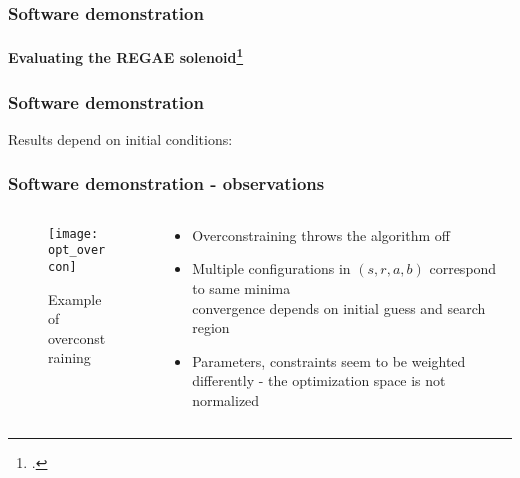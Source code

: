 
\begin{frame}
  \frametitle{Software demonstration}
  \rfn
  \framesubtitle{Evaluating the REGAE solenoid\footcite{Disser}}
  \begin{figure}
    \hspace{-0.5cm}
    \hspace{0.5cm}

  \end{figure}
\end{frame}

\begin{frame}
  \rfn
  \frametitle{Software demonstration}
  Results depend on initial conditions:
  \begin{figure}
    \hspace{-0.5cm}
    \hspace{0.5cm}

  \end{figure}
\end{frame}

\begin{frame}
  \rfn
  \frametitle{Software demonstration - observations}
  \begin{columns}
    \begin{column}{0.5\textwidth}
    \begin{figure}
      \texttt{[image: opt\_overcon]}
      \caption{Example of overconstraining}
    \end{figure}
    \end{column}
    \begin{column}{0.5\textwidth}
      \begin{itemize}
        \item Overconstraining throws the algorithm off
        \vspace{0.5cm}
        \item Multiple configurations in $(s, r, a, b)$ correspond to same minima\\
          \rarrow convergence depends on initial guess and search region
        \vspace{0.5cm}
        \item Parameters, constraints seem to be weighted differently - the optimization space is not normalized
      \end{itemize}
    \end{column}
  \end{columns}
\end{frame}

